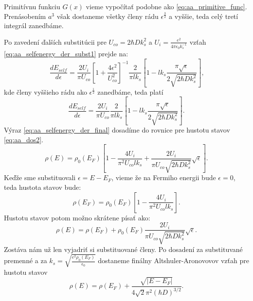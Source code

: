 Primitívnu funkciu $G(x)$ vieme vypočítať podobne ako \eqref{eq:aa_primitive_func}. Prenásobením $a^3$ však dostaneme všetky členy rádu $\epsilon^{\frac{3}{2}}$ a vyššie, teda celý tretí integrál zanedbáme.

Po zavedení ďalších substitúcii pre $U_{co}=2\hbar D k_s^2$ a $U_i=\frac{e^2}{4\pi \epsilon_0 k_s^{-1}}$ vzťah
\eqref{eq:aa_selfenergy_der_subst1} prejde na:
\begin{equation}
\label{eq:aa_selfenergy_der_final}
\frac{dE_{self}}{d\epsilon}=\frac{2 U_i}{\pi U_{co}}[1+\frac{4 \epsilon^2}{U_{co}^2}]^{-1}\frac{2}{\pi l k_s}[1-l k_s \frac{\pi\sqrt\epsilon}{2\sqrt{2\hbar D k_s^2}}]\text{,}
\end{equation}
kde členy vyššieho rádu ako $\epsilon^{\frac{1}{2}}$ zanedbáme, teda platí
\begin{equation}
\label{eq:aa_selfenergy_der_final}
\frac{dE_{self}}{d\epsilon}=\frac{2 U_i}{\pi U_{co}}\frac{2}{\pi l k_s}[1-l k_s \frac{\pi\sqrt\epsilon}{2\sqrt{2\hbar D k_s^2}}]\text{.}
\end{equation}
Výraz  \eqref{eq:aa_selfenergy_der_final} dosadíme do rovnice pre hustotu stavov \eqref{eq:aa_dos2}.
\begin{equation}
 \label{eq:aa_dos3}
 \rho(E)=\rho_0(E_F)[1-\frac{4 U_i}{\pi^2 U_{co} lk_s}+\frac{2U_i }{\pi U_{co} \sqrt{2\hbar Dk_s^2}}\sqrt\epsilon ]\text{.}
\end{equation}
Keďže sme substituovali $\epsilon=E-E_F$, vieme že na Fermiho energii bude $\epsilon=0$, teda hustota stavov bude:
\begin{equation}
 \label{eq:aa_dos_fermi}
 \rho(E_F)=\rho_0(E_F)[1-\frac{4 U_i}{\pi^2 U_{co} lk_s}]\text{.}
\end{equation}
Hustotu stavov potom možno skrátene písať ako:
\begin{equation}
 \label{eq:aa_dos4}
 \rho(E)=\rho(E_F)+\rho_0(E_F)\frac{2U_i }{\pi U_{co} \sqrt{2\hbar Dk_s^2}}\sqrt\epsilon\text{.}
\end{equation}
Zostáva nám už len vyjadriť si substituované členy. Po dosadení za substituvané premenné a za
$k_s=\sqrt{\frac{e^2 \rho_0(E_F)}{\epsilon_0}}$ dostaneme finálny Altshuler-Aronovovov vzťah pre hustotu stavov
\begin{equation}
 \label{eq:aa_dos_final}
 \rho(E)=\rho(E_F)+\frac{\sqrt{|E-E_F|}}{4\sqrt 2 \pi^2 (\hbar D)^{3/2}}\text{.}
\end{equation}
